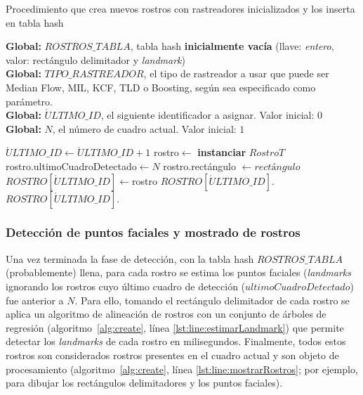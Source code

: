 \documentclass[a4paper,openright,12pt]{report}
\begin{document}
\begin{algorithm}
  \caption{Procedimiento que crea nuevos rostros con rastreadores inicializados
           y los inserta en tabla hash}
  \label{alg:create}
  \textbf{Global: }$ROSTROS\_TABLA$, tabla hash \textbf{inicialmente vacía}
      (llave: \textit{entero}, valor: rectángulo delimitador y \textit{landmark})\\
  \textbf{Global: }$TIPO\_RASTREADOR$, el tipo de rastreador a usar que puede
                                       ser Median Flow, MIL, KCF, TLD o
                                       Boosting, según sea especificado como
                                       parámetro.\\
  \textbf{Global: }$\acute{U}LTIMO\_ID$, el siguiente identificador a asignar. Valor inicial: $0$\\
  \textbf{Global: }$N$, el número de cuadro actual. Valor inicial: $1$\\
  \begin{algorithmic}[1]
        \State $\acute{U}LTIMO\_ID\gets \acute{U}LTIMO\_ID + 1$
        \label{lst:line:createRastrearActualizarUltimoFrame}
        \State rostro$\gets$ \textbf{instanciar} $RostroT$
        \label{lst:line:createBeginNewStruct}
        \State rostro.ultimoCuadroDetectado$\gets N$
        \State rostro.rectángulo $\gets rectángulo$
        \State $ROSTRO[\acute{U}LTIMO\_ID]\gets$rostro
        \State $ROSTRO[\acute{U}LTIMO\_ID].$
        \State $ROSTRO[\acute{U}LTIMO\_ID].$
        \label{lst:line:createEndNewStruct}
      \EndFor
    \EndProcedure
  \end{algorithmic}
\end{algorithm}

\subsubsection{Detección de puntos faciales y mostrado de rostros} \label{sssec:landmark}
Una vez terminada la fase de detección, con la tabla hash $ROSTROS\_TABLA$
(probablemente) llena, para cada rostro se estima los puntos faciales
(\textit{landmarks} ignorando los rostros cuyo último cuadro de detección
($ultimoCuadroDetectado$) fue anterior a $N$. Para ello, tomando el rectángulo
delimitador de cada rostro se aplica un algoritmo de alineación de
rostros con un conjunto de árboles de regresión (algoritmo~\ref{alg:create},
línea \ref{lst:line:estimarLandmark}) que permite detectar los
\textit{landmarks} de cada rostro en milisegundos. Finalmente, todos estos
rostros son considerados rostros presentes en el cuadro actual y son objeto de
procesamiento (algoritmo~\ref{alg:create}, línea \ref{lst:line:mostrarRostros};
por ejemplo, para dibujar los rectángulos delimitadores y los puntos faciales).
\end{document}
